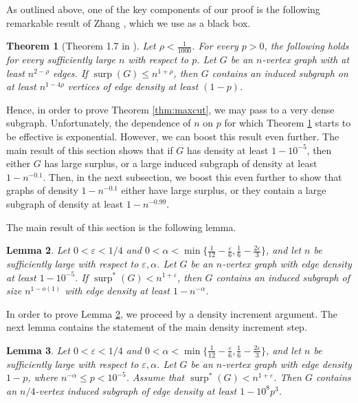 \documentclass[11pt]{article}
\theoremstyle{plain}
\newtheorem{theorem}{Theorem}[section]
\newtheorem{lemma}[theorem]{Lemma}
\theoremstyle{definition}
\DeclareMathOperator{\surp}{surp}
\newcommand{\eps}{\varepsilon}
\begin{document}
As outlined above, one of the key components of our proof is the following remarkable result of Zhang \cite{Zhang}, which we use as a black box.

\begin{theorem}[Theorem 1.7 in \cite{Zhang}]\label{thm:zhang}
Let $\rho<\frac{1}{1000}$. For every $p>0$, the following holds for every sufficiently large $n$ with respect to $p$. Let $G$ be an $n$-vertex graph with at least $n^{2-\rho}$ edges. If $\surp(G)\leq n^{1+\rho}$, then $G$ contains an induced subgraph on at least $n^{1-4\rho}$ vertices of edge density at least $(1-p)$.
\end{theorem}

Hence, in order to prove Theorem \ref{thm:maxcut}, we may pass to a very dense subgraph. Unfortunately, the dependence of $n$ on $p$ for which Theorem \ref{thm:zhang} starts to be effective is exponential. However, we can boost this result even further. The main result of this section shows that if $G$ has density at least $1-10^{-5}$, then either $G$ has large surplus, or a large induced subgraph of density at least $1-n^{-0.1}$. Then, in the next subsection, we boost this even further to show that graphs of density $1-n^{-0.1}$ either have large surplus, or they contain a large subgraph of density at least $1-n^{-0.99}$.


The main result of this section is the following lemma.

\begin{lemma}\label{lemma:main}
Let $0<\eps<1/4$ and $0<\alpha<\min\{\frac{1}{12}-\frac{\eps}{6},\frac{1}{6}-\frac{2\eps}{3}\}$, and let $n$ be sufficiently large with respect to $\eps,\alpha$. Let $G$ be an $n$-vertex graph with edge density at least $1-10^{-5}$. If $\surp^*(G)<n^{1+\eps}$, then $G$ contains an induced subgraph of size $n^{1-o(1)}$ with edge density at least $1-n^{-\alpha}$.
\end{lemma}


In order to prove Lemma \ref{lemma:main}, we proceed by a density increment argument. The next lemma contains the statement of the main density increment step.

\begin{lemma}\label{lemma:density_increment}
Let $0<\eps<1/4$ and $0<\alpha<\min\{\frac{1}{12}-\frac{\eps}{6},\frac{1}{6}-\frac{2\eps}{3}\}$, and let $n$ be sufficiently large with respect to $\eps,\alpha$. Let $G$ be an $n$-vertex graph with edge density $1-p$, where $n^{-\alpha}\leq p<10^{-5}$. Assume that $\surp^*(G)<n^{1+\eps}$. Then $G$ contains an $n/4$-vertex induced subgraph of edge density at least $1-10^8 p^3$.
\end{lemma}
\end{document}

